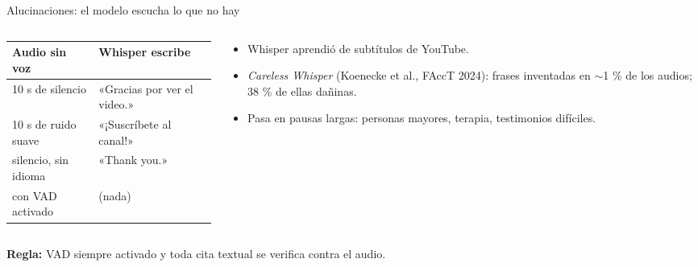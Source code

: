 \documentclass[aspectratio=169,11pt]{beamer}
\begin{document}
\begin{frame}{Alucinaciones: el modelo escucha lo que no hay}
  \begin{columns}[T]
    \begin{column}{0.5\textwidth}
      \small
      \begin{tabular}{ll}
        \toprule
        Audio sin voz & Whisper escribe \\
        \midrule
        10 s de silencio & «Gracias por ver el video.» \\
        10 s de ruido suave & «¡Suscríbete al canal!» \\
        silencio, sin idioma & «Thank you.» \\
        \midrule
        con VAD activado & \alert{(nada)} \\
        \bottomrule
      \end{tabular}
    \end{column}
    \begin{column}{0.46\textwidth}
      \small
      \begin{itemize}
        \item Whisper aprendió de subtítulos de YouTube.
        \item \emph{Careless Whisper} (Koenecke et al., FAccT 2024): frases inventadas en $\sim$1 \% de los audios; 38 \% de ellas dañinas.
        \item Pasa en \alert{pausas largas}: personas mayores, terapia, testimonios difíciles.
      \end{itemize}
    \end{column}
  \end{columns}
  \vspace{8pt}
  \centering \textbf{Regla:} VAD siempre activado y toda cita textual se verifica contra el audio.
\end{frame}
\end{document}
